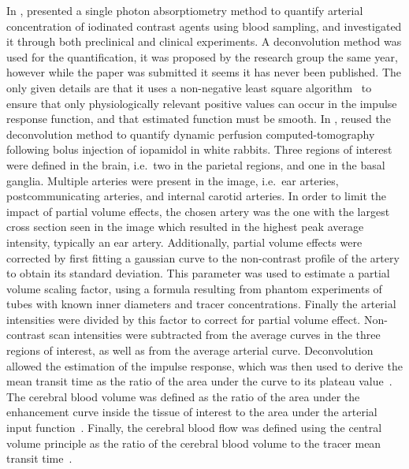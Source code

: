 In \citeyear{Yeung:1992df}, \citet{Yeung:1992df} presented a single photon absorptiometry method to quantify arterial concentration of iodinated contrast agents using blood sampling, and investigated it through both preclinical and clinical experiments.
A deconvolution method was used for the quantification, it was proposed by the research group the same year, however while the paper was submitted it seems it has never been published.
The only given details are that it uses a non-negative least square algorithm~\cite{Lawson:1995wg} to ensure that only physiologically relevant positive values can occur in the impulse response function, and that estimated function must be smooth.
In \citeyear{Cenic:1999un}, \citet{Cenic:1999un} reused the deconvolution method to quantify dynamic perfusion computed-tomography following bolus injection of iopamidol in white rabbits.
Three regions of interest were defined in the brain, i.e.~two in the parietal regions, and one in the basal ganglia.
Multiple arteries were present in the image, i.e.~ear arteries, postcommunicating arteries, and internal carotid arteries.
In order to limit the impact of partial volume effects, the chosen artery was the one with the largest cross section seen in the image which resulted in the highest peak average intensity, typically an ear artery.
Additionally, partial volume effects were corrected by first fitting a gaussian curve to the non-contrast profile of the artery to obtain its standard deviation.
This parameter was used to estimate a partial volume scaling factor, using a formula resulting from phantom experiments of tubes with known inner diameters and tracer concentrations.
Finally the arterial intensities were divided by this factor to correct for partial volume effect.
Non-contrast scan intensities were subtracted from the average curves in the three regions of interest, as well as from the average arterial curve. 
Deconvolution allowed the estimation of the impulse response, which was then used to derive the mean transit time as the ratio of the area under the curve to its plateau value~\cite{Axel:1982wu}.
The cerebral blood volume was defined as the ratio of the area under the enhancement curve inside the tissue of interest to the area under the arterial input function~\cite{Axel:1980jg}.
Finally, the cerebral blood flow was defined using the central volume principle as the ratio of the cerebral blood volume to the tracer mean transit time~\cite{Zierler:1962cx}.
